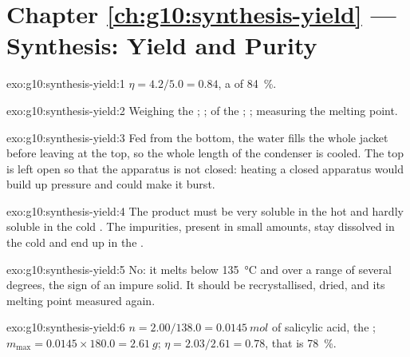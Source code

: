 \section*{Chapter \ref{ch:g10:synthesis-yield} --- Synthesis: Yield and Purity}

\begin{solution}{exo:g10:synthesis-yield:1}
$\eta = 4.2 / 5.0 = 0.84$, a  of \qty{84}{\percent}.
\end{solution}

\begin{solution}{exo:g10:synthesis-yield:2}
Weighing the ; ;  of the
; ; measuring the melting point.
\end{solution}

\begin{solution}{exo:g10:synthesis-yield:3}
Fed from the bottom, the water fills the whole jacket before leaving at
the top, so the whole length of the condenser is cooled. The top is left
open so that the apparatus is not closed: heating a closed apparatus
would build up pressure and could make it burst.
\end{solution}

\begin{solution}{exo:g10:synthesis-yield:4}
The product must be very soluble in the hot  and hardly soluble
in the cold . The impurities, present in small amounts, stay
dissolved in the cold  and end up in the .
\end{solution}

\begin{solution}{exo:g10:synthesis-yield:5}
No: it melts below \qty{135}{\celsius} and over a range of several
degrees, the sign of an impure solid. It should be recrystallised, dried,
and its melting point measured again.
\end{solution}

\begin{solution}{exo:g10:synthesis-yield:6}
$n = 2.00 / 138.0 = \qty{0.0145}{mol}$ of salicylic acid, the ; $m_{\max} = 0.0145 \times 180.0 = \qty{2.61}{g}$;
$\eta = 2.03 / 2.61 = 0.78$, that is \qty{78}{\percent}.
\end{solution}

